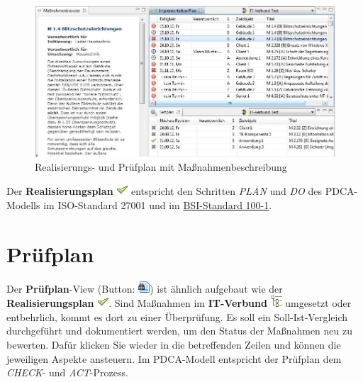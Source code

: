 \documentclass[a4paper,10pt]{book}
\begin{document}
\begin{figure}[htb!]
  \centering
  \includegraphics[scale=.36]{Screenshot/Realisierungsplan.jpg}
  \caption{\label{Realisierungs- und Pruefplan mit Massnahmenbeschreibung} Realisierungs- und Prüfplan mit Maßnahmenbeschreibung}
\end{figure}
Der \textbf{Realisierungsplan} \includegraphics[height=2ex]{Icon/Okay.png} entspricht den Schritten \textit{PLAN} und \textit{DO} des PDCA-Modells im ISO-Standard 27001 und im \href{https://www.bsi.bund.de/DE/Themen/ITGrundschutz/ITGrundschutzStandards/ITGrundschutzStandards_node.html#doc471418bodyText1}{BSI-Standard 100-1}.

\section{Prüfplan}
Der \textbf{Prüfplan}-View (Button: \includegraphics[height=2ex]{Icon/page_find.png}) ist ähnlich aufgebaut wie der \textbf{Realisierungsplan} \includegraphics[height=2ex]{Icon/Okay.png}. Sind Maßnahmen im \textbf{IT-Verbund} \includegraphics[height=2ex]{Icon/GS_Modell.png} umgesetzt oder entbehrlich, kommt es dort zu einer Überprüfung.  Es soll ein Soll-Ist-Vergleich durchgeführt und dokumentiert werden, um den Status der Maßnahmen neu zu bewerten. Dafür klicken Sie wieder in die betreffenden Zeilen und können die jeweiligen Aspekte ansteuern. Im PDCA-Modell entspricht der Prüfplan dem \textit{CHECK}- und \textit{ACT}-Prozess.
\end{document}
